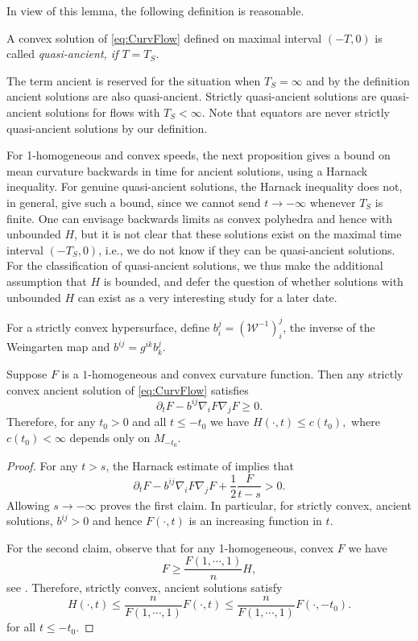 \documentclass{amsart}
\begin{document}
In view of this lemma, the following definition is reasonable.
\begin{defn}
A convex solution of \eqref{eq:CurvFlow} defined on maximal interval $(-T,0)$ is called \it{quasi-ancient}, if $T=T_S$.
\end{defn}
The term ancient is reserved for the situation when \(T_S=\infty\) and by the definition ancient solutions are also quasi-ancient. Strictly quasi-ancient solutions are quasi-ancient solutions for flows with $T_S < \infty$. Note that equators are never strictly quasi-ancient solutions by our definition.

For 1-homogeneous and convex speeds, the next proposition gives a bound on mean curvature backwards in time for ancient solutions, using a Harnack inequality. For genuine quasi-ancient solutions, the Harnack inequality does not, in general, give such a bound, since we cannot send \(t \to -\infty\) whenever \(T_S\) is finite. One can envisage backwards limits as convex polyhedra and hence with unbounded \(H\), but it is not clear that these solutions exist on the maximal time interval \((-T_S, 0)\), i.e., we do not know if they can be quasi-ancient solutions. For the classification of quasi-ancient solutions, we thus make the additional assumption that \(H\) is bounded, and defer the question of whether solutions with unbounded \(H\) can exist as a very interesting study for a later date.

For a strictly convex hypersurface, define $b^j_i = (\mathcal{W}^{-1})^j_i$, the inverse of the Weingarten map and $b^{ij} = g^{ik}b^j_k$.

\begin{prop}
\label{cor:boundedH}
Suppose $F$ is a \(1\)-homogeneous and convex curvature function. Then any strictly convex ancient solution of \eqref{eq:CurvFlow} satisfies
\[\partial_t F-b^{ij}\nabla_i F \nabla_j F \geq 0.\]
Therefore, for any $t_0 > 0$ and all $t\le -t_0$ we have
$H(\cdot,t)\leq c(t_0),$
where $c(t_0)<\infty$ depends only on $M_{-t_0}.$
\end{prop}
\begin{proof}
For any $t>s$, the  Harnack estimate of \cite[Theorem 1]{BryanIvakiScheuer:12/2015} implies that
$$\partial_t F-b^{ij}\nabla_i F\nabla_j F+\frac{1}{2}\frac{F}{t-s}>0.$$
Allowing $s\to-\infty$ proves the first claim. In particular, for strictly convex, ancient solutions, $b^{ij} > 0$ and hence $F(\cdot, t)$ is an increasing function in $t$.

For the second claim, observe that for any 1-homogeneous, convex $F$ we have \[F\ge \frac{F(1,\cdots,1)}{n}H,\]
see \cite[Lemma~2.2.20]{Gerhardt:/2006}. Therefore, strictly convex, ancient solutions satisfy
\[H(\cdot,t)\leq \frac{n}{F(1,\cdots,1)}F(\cdot,t)\leq \frac{n}{F(1,\cdots,1)}F(\cdot,-t_0). \]
for all \(t \leq -t_0\).
\end{proof}
\end{document}

